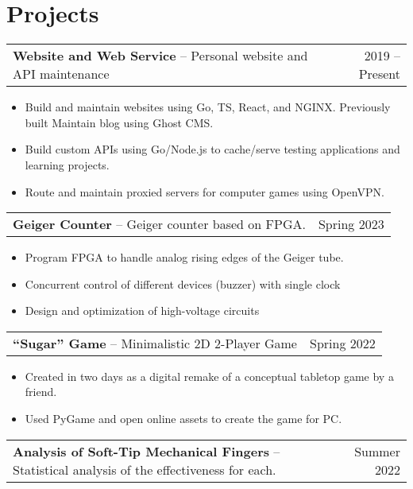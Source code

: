 \documentclass[oneside, 11pt]{article}
\newcommand*{\projectEntry}[3]{
	\noindent
	\begin{tabularx}{\textwidth}{Xr}
	\textbf{#1} -- #3 & #2
	\end{tabularx}
	\vspace{-1.25\baselineskip}
}
\newenvironment{expD}
	{\begin{itemize}[noitemsep,topsep=0pt]}
	{\end{itemize}}
\begin{document}

\section*{Projects}

\projectEntry{Website and Web Service}
	{2019 -- Present}
	{Personal website and API maintenance}

\begin{expD}
	\item Build and maintain websites using Go, TS, React, and NGINX. Previously built  Maintain blog using Ghost CMS.
	\item Build custom APIs using Go/Node.js to cache/serve testing applications and learning projects.
	\item Route and maintain proxied servers for computer games using OpenVPN.
\end{expD}

\projectEntry{Geiger Counter}
	{Spring 2023}
	{Geiger counter based on FPGA.}

\begin{expD}
	\item Program FPGA to handle analog rising edges of the Geiger tube.
	\item Concurrent control of different devices (buzzer) with single clock
	\item Design and optimization of high-voltage circuits
\end{expD}

\projectEntry{``Sugar'' Game}
	{Spring 2022}
	{Minimalistic 2D 2-Player Game}

\begin{expD}
	\item Created in two days as a digital remake of a conceptual tabletop game by a friend.
	\item Used PyGame and open online assets to create the game for PC.
\end{expD}

\projectEntry{Analysis of Soft-Tip Mechanical Fingers}
	{Summer 2022}
	{Statistical analysis of the effectiveness for each.}
\end{document}
